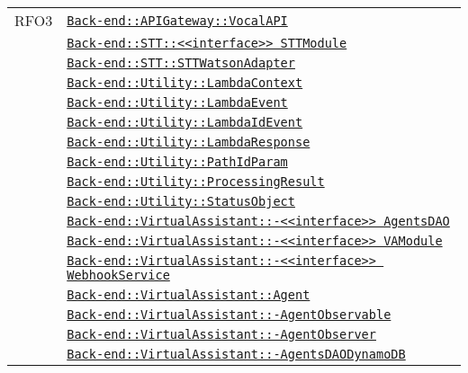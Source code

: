 \begin{longtable}{|>{\centering}m{3cm}|m{10cm}<{\centering}|}
RFO3 & \hyperref[Back-end::APIGateway::VocalAPI]{\texttt{Back-end::APIGateway::VocalAPI}}\\
& \hyperref[Back-end::STT::<<interface>> STTModule]{\texttt{Back-end::STT::<<interface>> STTModule}}\\
& \hyperref[Back-end::STT::STTWatsonAdapter]{\texttt{Back-end::STT::STTWatsonAdapter}}\\
& \hyperref[Back-end::Utility::LambdaContext]{\texttt{Back-end::Utility::LambdaContext}}\\
& \hyperref[Back-end::Utility::LambdaEvent]{\texttt{Back-end::Utility::LambdaEvent}}\\
& \hyperref[Back-end::Utility::LambdaIdEvent]{\texttt{Back-end::Utility::LambdaIdEvent}}\\
& \hyperref[Back-end::Utility::LambdaResponse]{\texttt{Back-end::Utility::LambdaResponse}}\\
& \hyperref[Back-end::Utility::PathIdParam]{\texttt{Back-end::Utility::PathIdParam}}\\
& \hyperref[Back-end::Utility::ProcessingResult]{\texttt{Back-end::Utility::ProcessingResult}}\\
& \hyperref[Back-end::Utility::StatusObject]{\texttt{Back-end::Utility::StatusObject}}\\
& \hyperref[Back-end::VirtualAssistant::<<interface>> AgentsDAO]{\texttt{Back-end::VirtualAssistant::-\linebreak <<interface>> AgentsDAO}}\\
& \hyperref[Back-end::VirtualAssistant::<<interface>> VAModule]{\texttt{Back-end::VirtualAssistant::-\linebreak <<interface>> VAModule}}\\
& \hyperref[Back-end::VirtualAssistant::<<interface>> WebhookService]{\texttt{Back-end::VirtualAssistant::-\linebreak <<interface>> WebhookService}}\\
& \hyperref[Back-end::VirtualAssistant::Agent]{\texttt{Back-end::VirtualAssistant::Agent}}\\
& \hyperref[Back-end::VirtualAssistant::AgentObservable]{\texttt{Back-end::VirtualAssistant::-\linebreak AgentObservable}}\\
& \hyperref[Back-end::VirtualAssistant::AgentObserver]{\texttt{Back-end::VirtualAssistant::-\linebreak AgentObserver}}\\
& \hyperref[Back-end::VirtualAssistant::AgentsDAODynamoDB]{\texttt{Back-end::VirtualAssistant::-\linebreak AgentsDAODynamoDB}}\\

\end{longtable}
